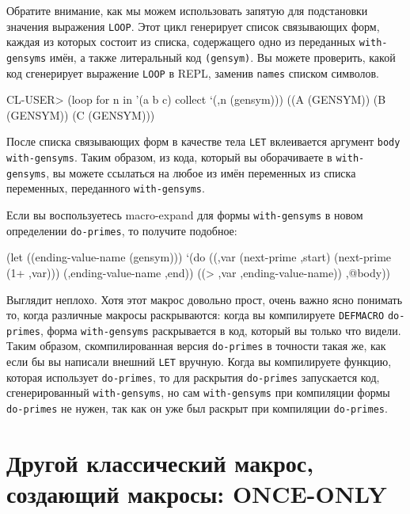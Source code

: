 Обратите внимание, как мы можем использовать запятую для подстановки значения выражения
\lstinline{LOOP}. Этот цикл генерирует список связывающих форм, каждая из которых состоит из
списка, содержащего одно из переданных \lstinline{with-gensyms} имён, а также литеральный код
\lstinline{(gensym)}. Вы можете проверить, какой код сгенерирует выражение \lstinline{LOOP} в
REPL, заменив \lstinline{names} списком символов.

\begin{myverb}
CL-USER> (loop for n in '(a b c) collect `(,n (gensym)))
((A (GENSYM)) (B (GENSYM)) (C (GENSYM)))
\end{myverb}

После списка связывающих форм в качестве тела \lstinline{LET} вклеивается аргумент
\lstinline{body} \lstinline{with-gensyms}. Таким образом, из кода, который вы оборачиваете в
\lstinline{with-gensyms}, вы можете ссылаться на любое из имён переменных из списка переменных,
переданного \lstinline{with-gensyms}.

Если вы воспользуетесь macro-expand для формы \lstinline{with-gensyms} в новом определении
\lstinline{do-primes}, то получите подобное:

\begin{myverb}
(let ((ending-value-name (gensym)))
  `(do ((,var (next-prime ,start) (next-prime (1+ ,var)))
        (,ending-value-name ,end))
       ((> ,var ,ending-value-name))
     ,@body))
\end{myverb}

Выглядит неплохо. Хотя этот макрос довольно прост, очень важно ясно понимать то, когда
различные макросы раскрываются: когда вы компилируете \lstinline{DEFMACRO} \lstinline{do-primes},
форма \lstinline{with-gensyms} раскрывается в код, который вы только что видели. Таким образом,
скомпилированная версия \lstinline{do-primes} в точности такая же, как если бы вы написали
внешний \lstinline{LET} вручную. Когда вы компилируете функцию, которая использует
\lstinline{do-primes}, то для раскрытия \lstinline{do-primes} запускается код,
сгенерированный \lstinline{with-gensyms}, но сам \lstinline{with-gensyms} при компиляции формы
\lstinline{do-primes} не нужен, так как он уже был раскрыт при компиляции \lstinline{do-primes}.


\section{Другой классический макрос, создающий макросы: ONCE-ONLY}

